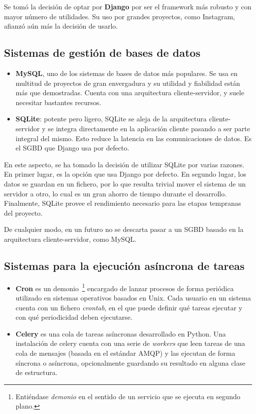 Se tomó la decisión de optar por \textbf{Django} por ser el framework más
robusto y con mayor número de utilidades. Su uso por grandes proyectos, como
Instagram, afianzó aún más la decisión de usarlo.

\subsection{Sistemas de gestión de bases de datos}

\begin{itemize}
\item \textbf{MySQL}, uno de los sistemas de bases de datos más populares. Se
  usa en multitud de proyectos de gran envergadura y su utilidad y fiabilidad
  están más que demostradas. Cuenta con una arquitectura cliente-servidor, y
  suele necesitar bastantes recursos.

\item \textbf{SQLite}: potente pero ligero, SQLite se aleja de la arquitectura
  cliente-servidor y se integra directamente en la aplicación cliente pasando a
  ser parte integral del mismo. Esto reduce la latencia en las comunicaciones de
  datos. Es el SGBD que Django usa por defecto.

\end{itemize}

En este aspecto, se ha tomado la decisión de utilizar SQLite por varias
razones. En primer lugar, es la opción que usa Django por defecto. En segundo
lugar, los datos se guardan en un fichero, por lo que resulta trivial mover el
sistema de un servidor a otro, lo cual es un gran ahorro de tiempo durante el
desarrollo. Finalmente, SQLite provee el rendimiento necesario para las etapas
tempranas del proyecto.

De cualquier modo, en un futuro no se descarta pasar a un SGBD basado en la
arquitectura cliente-servidor, como MySQL.

\subsection{Sistemas para la ejecución asíncrona de tareas}

\begin{itemize}
\item \textbf{Cron} es un demonio~\footnote{Entiéndase \textit{demonio} en el
    sentido de un servicio que se ejecuta en segundo plano.} encargado de lanzar
  procesos de forma periódica utilizado en sistemas operativos basados en
  Unix. Cada usuario en un sistema cuenta con un fichero \textit{crontab}, en el
  que puede definir qué tareas ejecutar y con qué periodicidad deben ejecutarse. 

\item \textbf{Celery} es una cola de tareas asíncronas desarrollado en
  Python. Una instalación de celery cuenta con una serie de \textit{workers} que
  leen tareas de una cola de mensajes (basada en el estándar \ac{AMQP}) y las
  ejecutan de forma síncrona o asíncrona, opcionalmente guardando su resultado
  en alguna clase de estructura. 

\end{itemize}

